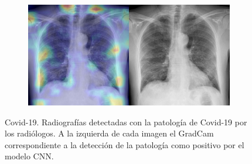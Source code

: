 \begin{figure}[b]
\begin{subfigure}{0.4\textwidth}
    \end{subfigure}
    \begin{subfigure}{0.4\textwidth}
        \centering
        \includegraphics[width=1.0\textwidth]{Chapters/5. Conclusiones/img/COVID-19/1_1_covid-19-pneumonia-20-pa-on-admission.jpg}
    \end{subfigure}

    \caption[short]{Covid-19. Radiografías detectadas con la patología de Covid-19 por los
                    radiólogos. A la izquierda de cada imagen el GradCam correspondiente a la detección
                    de la patología como positivo por el modelo CNN.}
\end{figure}

